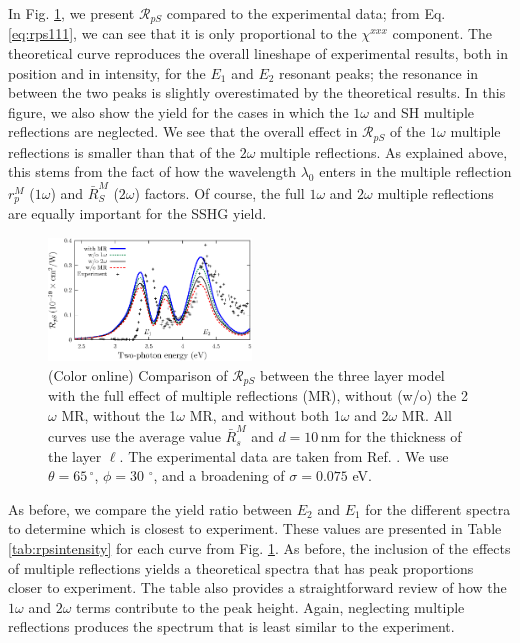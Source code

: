 \documentclass[aps,prb,10pt,showpacs,letterpaper,twocolumn]{revtex4-1}
\begin{document}
In Fig. \ref{fig:rps}, we present $\mathcal{R}_{pS}$ compared to the
experimental data; from Eq. \eqref{eq:rps111}, we can see that it is only
proportional to the $\chi^{xxx}$ component. The theoretical curve reproduces the
overall lineshape of experimental results, both in position and in intensity,
for the $E_1$ and $E_2$ resonant peaks; the resonance in between the two peaks
is slightly overestimated by the theoretical results. In this figure, we also
show the yield for the cases in which the $1\omega$ and SH multiple reflections
are neglected. We see that the overall effect in $\mathcal{R}_{pS}$ of the
$1\omega$ multiple reflections is smaller than that of the $2\omega$ multiple
reflections. As explained above, this stems from the fact of how the wavelength
$\lambda_{0}$ enters in the multiple reflection $r^{M}_p$ ($1\omega$) and
$\bar{R}^{M}_S$ ($2\omega$) factors. Of course, the full $1\omega$ and $2\omega$
multiple reflections are equally important for the SSHG yield.

\begin{figure}[t]
\includegraphics[width=0.48\textwidth]{figures/fig4}
\caption{(Color online) Comparison of ${\mathcal R}_{pS}$ between the three
layer model with the full effect of multiple reflections (MR), without (w/o) the
2$\omega$ MR, without the 1$\omega$ MR, and without both 1$\omega$ and 2$\omega$
MR. All curves use the average value $\bar{R}^{M}_{s}$ and $d = 10\,\mathrm{nm}$
for the thickness of the layer $\ell$. The experimental data are taken from Ref.
. We use $\theta = 65\,^{\circ}$, $\phi =
30\,\,^{\circ}$, and a broadening of $\sigma = 0.075$ eV.}
\label{fig:rps}
\end{figure}

{\color{red}
As before, we compare the yield ratio between $E_{2}$ and $E_{1}$ for the
different spectra to determine which is closest to experiment. These values are
presented in Table \ref{tab:rpsintensity} for each curve from Fig.
\ref{fig:rps}. As before, the inclusion of the effects of multiple reflections
yields a theoretical spectra that has peak proportions closer to experiment. The
table also provides a straightforward review of how the $1\omega$ and $2\omega$
terms contribute to the peak height. Again, neglecting multiple reflections
produces the spectrum that is least similar to the experiment.
}
\end{document}
